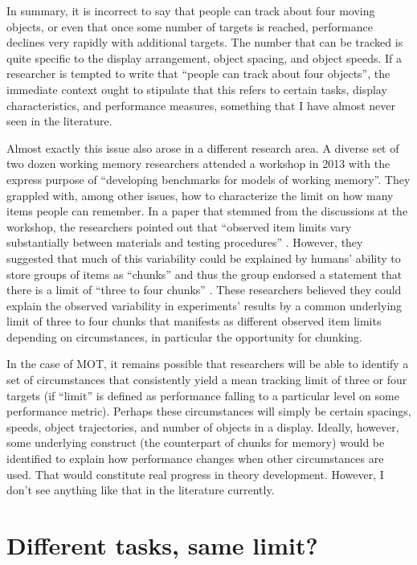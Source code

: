 \documentclass[
]{book}
\begin{document}
In summary, it is incorrect to say that people can track about four moving objects, or even that once some number of targets is reached, performance declines very rapidly with additional targets. The number that can be tracked is quite specific to the display arrangement, object spacing, and object speeds. If a researcher is tempted to write that ``people can track about four objects'', the immediate context ought to stipulate that this refers to certain tasks, display characteristics, and performance measures, something that I have almost never seen in the literature.

Almost exactly this issue also arose in a different research area. A diverse set of two dozen working memory researchers attended a workshop in 2013 with the express purpose of ``developing benchmarks for models of working memory''. They grappled with, among other issues, how to characterize the limit on how many items people can remember. In a paper that stemmed from the discussions at the workshop, the researchers pointed out that ``observed item limits vary substantially between materials and testing procedures'' \citep{oberauerBenchmarksModelsShortterm2018}. However, they suggested that much of this variability could be explained by humans' ability to store groups of items as ``chunks'' and thus the group endorsed a statement that there is a limit of ``three to four chunks'' \citep{cowanMagicalNumberShortterm2001a}. These researchers believed they could explain the observed variability in experiments' results by a common underlying limit of three to four chunks that manifests as different observed item limits depending on circumstances, in particular the opportunity for chunking.

In the case of MOT, it remains possible that researchers will be able to identify a set of circumstances that consistently yield a mean tracking limit of three or four targets (if ``limit'' is defined as performance falling to a particular level on some performance metric). Perhaps these circumstances will simply be certain spacings, speeds, object trajectories, and number of objects in a display. Ideally, however, some underlying construct (the counterpart of chunks for memory) would be identified to explain how performance changes when other circumstances are used. That would constitute real progress in theory development. However, I don't see anything like that in the literature currently.

\hypertarget{different-tasks-same-limit}{%
\section{Different tasks, same limit?}\label{different-tasks-same-limit}}
\end{document}
